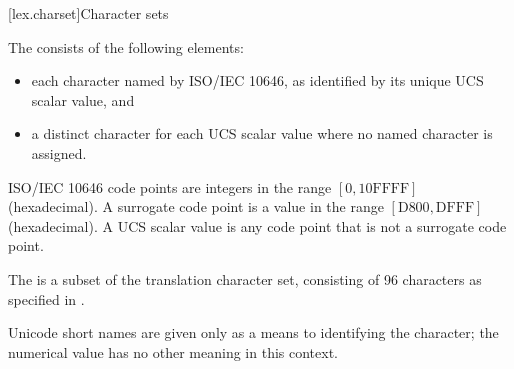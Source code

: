 [lex.charset]{Character sets}

\pnum
{}%
The  consists of the following elements:
\begin{itemize}
\item
each character named by ISO/IEC 10646,
as identified by its unique UCS scalar value, and
\item
a distinct character for each UCS scalar value
where no named character is assigned.
\end{itemize}
\begin{note}
ISO/IEC 10646 code points are integers
in the range $[0, \mathrm{10FFFF}]$ (hexadecimal).
A surrogate code point is a value
in the range $[\mathrm{D800}, \mathrm{DFFF}]$ (hexadecimal).
A UCS scalar value is any code point that is not a surrogate code point.
\end{note}

\pnum
The  is a subset of the translation character set,
consisting of 96 characters as specified in .
\begin{note}
Unicode short names are given only as a means to identifying the character;
the numerical value has no other meaning in this context.
\end{note}

